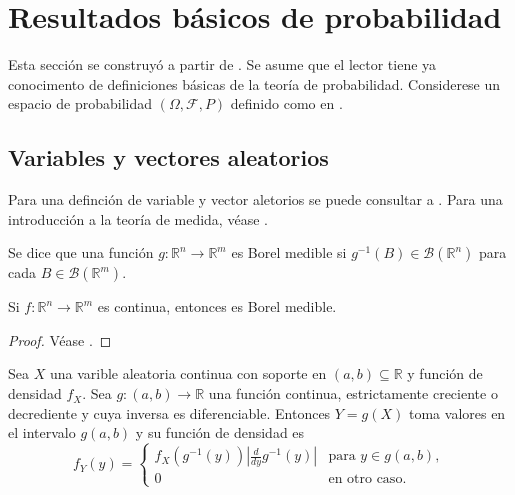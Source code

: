 \section{Resultados básicos de probabilidad}

Esta sección se construyó a partir de  
\cite{billingsleyProbabilityMeasure1995,
rinconCursoIntermedioProbabilidad2007,
mardiaMultivariateAnalysis1979}. Se asume que el 
lector tiene ya conocimento de definiciones básicas de 
la teoría de probabilidad.
Considerese un espacio de probabilidad $(\Omega,
\mathcal F, P)$ definido como en 
\cite{rinconCursoIntermedioProbabilidad2007}. 


\subsection{Variables y vectores aleatorios} 

Para una definción de variable y vector aletorios se puede 
consultar a \cite{rinconCursoIntermedioProbabilidad2007}. 
Para una introducción a la teoría de medida, véase 
\cite{billingsleyProbabilityMeasure1995}.

\begin{definition}
    Se dice que una función $g:\mathbb R^n\to \mathbb R^m$  
    es Borel medible si $g^{-1}(B)\in \mathcal B(\mathbb R^n)$ para 
    cada $B\in \mathcal B(\mathbb R^m)$.
\end{definition}

\begin{proposition}
    Si $f:\mathbb R^n\to \mathbb R^m$ es continua, entonces es
    Borel medible.
\end{proposition}

\begin{proof}
    Véase \cite{billingsleyProbabilityMeasure1995}.
\end{proof}

\begin{theorem}
    Sea $X$ una varible aleatoria continua con soporte en 
    $(a,b)\subseteq \mathbb R$ y función de densidad $f_X$. Sea 
    $g:(a,b)\to \mathbb R$ una función continua, estrictamente 
    creciente o decrediente y cuya inversa es diferenciable. 
    Entonces $Y=g(X)$ toma valores en el intervalo $g(a,b)$ y 
    su función de densidad es 
    $$f_Y(y) = 
    \begin{cases}
    f_X(g^{-1}(y))\left|\frac{d}{dy}g^{-1}(y)\right| & \text{para } y\in g(a,b),\\
    0 & \text{en otro caso}.
    \end{cases}$$
\end{theorem}

